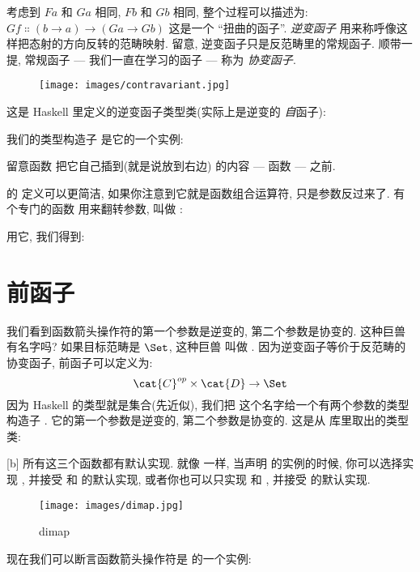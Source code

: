 考虑到 $F a$ 和 $G a$ 相同, $F b$ 和 $G b$ 相同, 整个过程可以描述为: $G f \Colon (b \to a) \to (G a \to G b)$
这是一个 ``扭曲的函子''. \emph{逆变函子} 用来称呼像这样把态射的方向反转的范畴映射. 留意, 逆变函子只是反范畴里的常规函子.
顺带一提, 常规函子 --- 我们一直在学习的函子 --- 称为 \emph{协变函子}.

\begin{figure}[H]
  \centering
  \texttt{[image: images/contravariant.jpg]}
\end{figure}

\noindent
这是 Haskell 里定义的逆变函子类型类(实际上是逆变的 \emph{自}函子):

我们的类型构造子  是它的一个实例:

留意函数  把它自己插到(就是说放到右边) 的内容 --- 函数  --- 之前.

 的  定义可以更简洁, 如果你注意到它就是函数组合运算符, 只是参数反过来了. 有个专门的函数
用来翻转参数, 叫做 :

用它, 我们得到:


\section{前函子}

我们看到函数箭头操作符的第一个参数是逆变的, 第二个参数是协变的. 这种巨兽有名字吗? 如果目标范畴是 $\Set$, 这种巨兽
叫做 . 因为逆变函子等价于反范畴的协变函子, 前函子可以定义为:
\[\cat{C}^{op} \times \cat{D} \to \Set\]
因为 Haskell 的类型就是集合(先近似), 我们把  这个名字给一个有两个参数的类型构造子 .
它的第一个参数是逆变的, 第二个参数是协变的. 这是从  库里取出的类型类:

[b]
所有这三个函数都有默认实现. 就像  一样, 当声明  的实例的时候, 你可以选择实现
, 并接受  和  的默认实现, 或者你也可以只实现  和 ,
并接受  的默认实现.

\begin{figure}[H]
  \centering
  \texttt{[image: images/dimap.jpg]}
  \caption{dimap}
\end{figure}

\noindent
现在我们可以断言函数箭头操作符是  的一个实例:

